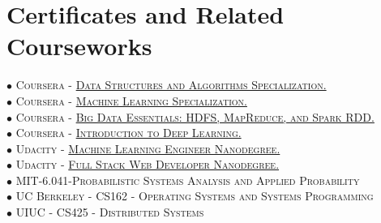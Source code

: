 \documentclass[10pt]{article}
\begin{document}
    \section{Certificates and Related Courseworks}
        \vspace{-2mm}

        $\bullet$ \textsc{Coursera - \href{https://www.coursera.org/account/accomplishments/specialization/certificate/AKFYZQ9QD8XH}{Data Structures and Algorithms Specialization.}} \\
        $\bullet$ \textsc{Coursera - \href{https://www.coursera.org/account/accomplishments/specialization/certificate/ZUGAFYKCMQ79}{Machine Learning Specialization.}} \\
        $\bullet$ \textsc{Coursera - \href{https://www.coursera.org/account/accomplishments/certificate/G25TQPPNXGW5}{Big Data Essentials: HDFS, MapReduce, and Spark RDD.}} \\
        $\bullet$ \textsc{Coursera - \href{https://www.coursera.org/account/accomplishments/certificate/XN2B7T4AJX8C}{Introduction to Deep Learning.}} \\
        $\bullet$ \textsc{Udacity - \href{https://graduation.udacity.com/confirm/HK9JLR3N}{Machine Learning Engineer Nanodegree.}} \\
        $\bullet$ \textsc{Udacity - \href{https://graduation.udacity.com/confirm/KPSCQGZK}{Full Stack Web Developer Nanodegree.}} \\
        $\bullet$ \textsc{MIT-6.041-Probabilistic Systems Analysis and Applied Probability} \\
        $\bullet$ \textsc{UC Berkeley - CS162 - Operating Systems and Systems Programming} \\
        $\bullet$ \textsc{UIUC - CS425 - Distributed Systems}
\end{document}
